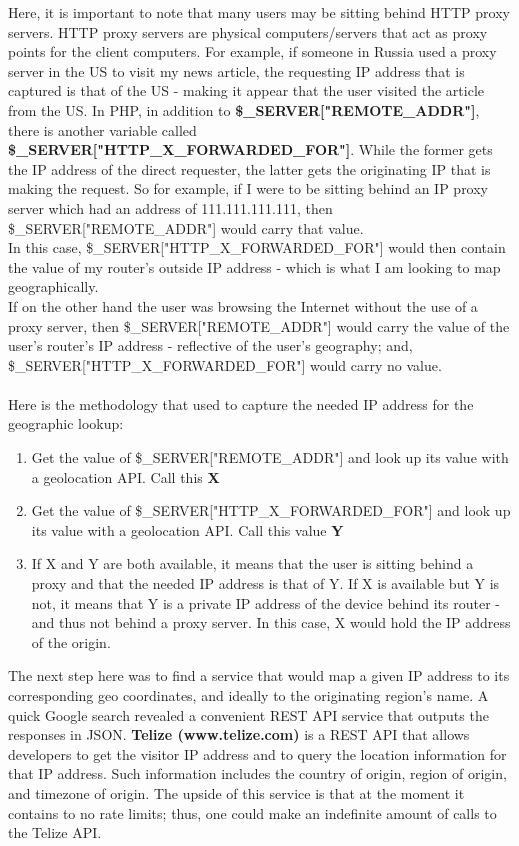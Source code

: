 \documentclass[12pt]{article}
\begin{document}
Here, it is important to note that many users may be sitting behind HTTP proxy servers. HTTP proxy servers are physical computers/servers that act as proxy points for the client computers. For example, if someone in Russia used a proxy server in the US to visit my news article, the requesting IP address that is captured is that of the US - making it appear that the user visited the article from the US. In PHP, in addition to \textbf{\$\_SERVER["REMOTE\_ADDR"]}, there is another variable called \\ \textbf{\$\_SERVER["HTTP\_X\_FORWARDED\_FOR"]}. While the former gets the IP address of the direct requester, the latter gets the originating IP that is making the request. So for example, if I were to be sitting behind an IP proxy server which had an address of 111.111.111.111, then \\ \$\_SERVER["REMOTE\_ADDR"] would carry that value. \\
In this case, \$\_SERVER["HTTP\_X\_FORWARDED\_FOR"] would then contain the value of my router's outside IP address - which is what I am looking to map geographically.   
\\ If on the other hand the user was browsing the Internet without the use of a proxy server, then \$\_SERVER["REMOTE\_ADDR"] would carry the value of the user's router's IP address - reflective of the user's geography; and, \$\_SERVER["HTTP\_X\_FORWARDED\_FOR"] would carry no value. \\ \\
\noindent Here is the methodology that used to capture the needed IP address for the geographic lookup:
\begin{enumerate}
\item Get the value of \$\_SERVER["REMOTE\_ADDR"] and look up its value with a geolocation API. Call this \textbf{X}
\item Get the value of \$\_SERVER["HTTP\_X\_FORWARDED\_FOR"] and look up its value with a geolocation API. Call this value \textbf{Y}
\item If X and Y are both available, it means that the user is sitting behind a proxy and that the needed IP address is that of Y. If X is available but Y is not, it means that Y is a private IP address of the device behind its router - and thus not behind a proxy server. In this case, X would hold the IP address of the origin.
\end{enumerate} 

The next step here was to find a service that would map a given IP address to its corresponding geo coordinates, and ideally to the originating region's name. A quick Google search revealed a convenient REST API service that outputs the responses in JSON. \textbf{Telize (www.telize.com)} is a REST API that allows developers to get the visitor IP address and to query the location information for that IP address. Such information includes the country of origin, region of origin, and timezone of origin. The upside of this service is that at the moment it contains to no rate limits; thus, one could make an indefinite amount of calls to the Telize API.
\end{document}
